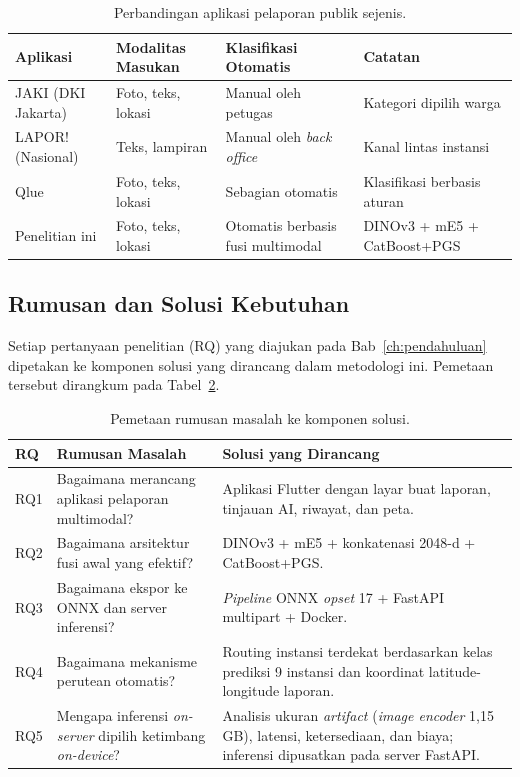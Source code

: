 \begin{table}[htbp]
\centering
\caption{Perbandingan aplikasi pelaporan publik sejenis.}
\label{tab:aplikasi-sejenis}
\begin{tabular}{p{2.4cm} p{3.0cm} p{3.0cm} p{3.6cm}}
\toprule
\textbf{Aplikasi} & \textbf{Modalitas Masukan} & \textbf{Klasifikasi Otomatis} & \textbf{Catatan} \\
\midrule
JAKI (DKI Jakarta) & Foto, teks, lokasi & Manual oleh petugas & Kategori dipilih warga \\
LAPOR! (Nasional) & Teks, lampiran & Manual oleh \textit{back office} & Kanal lintas instansi \\
Qlue & Foto, teks, lokasi & Sebagian otomatis & Klasifikasi berbasis aturan \\
Penelitian ini & Foto, teks, lokasi & Otomatis berbasis fusi multimodal & DINOv3 + mE5 + CatBoost+PGS \\
\bottomrule
\end{tabular}
\end{table}

\subsection{Rumusan dan Solusi Kebutuhan}

Setiap pertanyaan penelitian (RQ) yang diajukan pada Bab~\ref{ch:pendahuluan} dipetakan ke komponen solusi yang dirancang dalam metodologi ini. Pemetaan tersebut dirangkum pada Tabel~\ref{tab:rumusan-solusi}.

\begin{table}[htbp]
\centering
\caption{Pemetaan rumusan masalah ke komponen solusi.}
\label{tab:rumusan-solusi}
\setlength{\tabcolsep}{4pt}
\begin{tabular}{p{0.7cm} p{6.3cm} p{6.3cm}}
\toprule
\textbf{RQ} & \textbf{Rumusan Masalah} & \textbf{Solusi yang Dirancang} \\
\midrule
RQ1 & Bagaimana merancang aplikasi pelaporan multimodal? & Aplikasi Flutter dengan layar buat laporan, tinjauan AI, riwayat, dan peta. \\
RQ2 & Bagaimana arsitektur fusi awal yang efektif? & DINOv3 + mE5 + konkatenasi 2048-d + CatBoost+PGS. \\
RQ3 & Bagaimana ekspor ke ONNX dan server inferensi? & \textit{Pipeline} ONNX \textit{opset} 17 + FastAPI multipart + Docker. \\
RQ4 & Bagaimana mekanisme perutean otomatis? & Routing instansi terdekat berdasarkan kelas prediksi 9 instansi dan koordinat latitude-longitude laporan. \\
RQ5 & Mengapa inferensi \textit{on-server} dipilih ketimbang \textit{on-device}? & Analisis ukuran \textit{artifact} (\textit{image encoder} 1,15 GB), latensi, ketersediaan, dan biaya; inferensi dipusatkan pada server FastAPI. \\
\bottomrule
\end{tabular}
\end{table}

